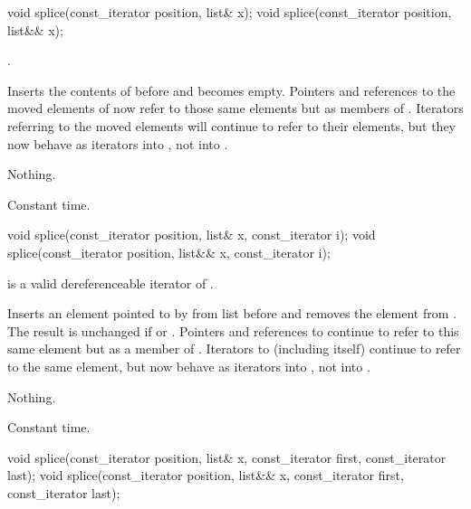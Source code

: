 %
\begin{itemdecl}
void splice(const_iterator position, list& x);
void splice(const_iterator position, list&& x);
\end{itemdecl}

\begin{itemdescr}
\pnum
\requires
{}.

\pnum
\effects
Inserts the contents of
before
and
becomes empty.
Pointers and references to the moved elements of
now refer to those same elements but as members of
.
Iterators referring to the moved elements will continue to refer to their
elements, but they now behave as iterators into
,
not into
.

\pnum
\throws Nothing.

\pnum
\complexity
Constant time.
\end{itemdescr}

%
\begin{itemdecl}
void splice(const_iterator position, list& x, const_iterator i);
void splice(const_iterator position, list&& x, const_iterator i);
\end{itemdecl}

\begin{itemdescr}
\pnum
\requires
{}
is a valid dereferenceable iterator of
.

\pnum
\effects
Inserts an element pointed to by
from list
before  and removes the element from
.
The result is unchanged if
or
.
Pointers and references to
continue to refer to this same element but as a member of
.
Iterators
to
(including
itself) continue to refer to the same element, but now behave as iterators into
,
not into
.

\pnum
\throws Nothing.

\pnum
\complexity
Constant time.
\end{itemdescr}

%
\begin{itemdecl}
void splice(const_iterator position, list& x, const_iterator first,
            const_iterator last);
void splice(const_iterator position, list&& x, const_iterator first,
            const_iterator last);
\end{itemdecl}

